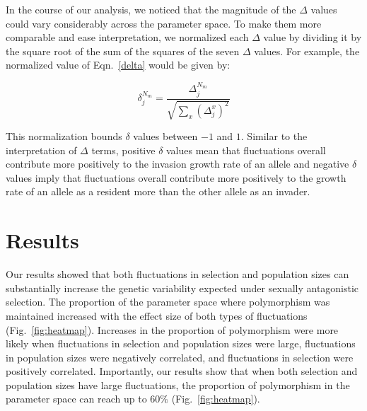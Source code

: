 \begin{refsection}
In the course of our analysis, we noticed that the magnitude of the $\Delta$ values could vary considerably across the parameter space. To make them more comparable and ease interpretation, we normalized each $\Delta$ value by dividing it by the square root of the sum of the squares of the seven $\Delta$ values. For example, the normalized value of Eqn.~\ref{delta} would be given by:



\begin{equation}
  \delta^{N_{m}}_{j}= \frac{\Delta^{N_{m}}_{j}}{\sqrt{
    \sum\limits_{x} (\Delta_{j}^{x})^{2} }}
\end{equation}

This normalization bounds $\delta$ values between $-1$ and $1$. Similar to the interpretation of $\Delta$ terms, positive $\delta$ values mean that fluctuations overall contribute more positively to the invasion growth rate of an allele and negative $\delta$ values imply that fluctuations overall contribute more positively to the growth rate of an allele as a resident more than the other allele as an invader.



\section*{Results}
Our results showed that both fluctuations in selection and population sizes can substantially increase the  genetic variability expected under sexually antagonistic selection. The proportion of the parameter space where polymorphism was maintained increased with the effect size of both types of fluctuations (Fig.~\ref{fig:heatmap}). Increases in the proportion of polymorphism were more likely when fluctuations in selection and population sizes were large, fluctuations in population sizes were negatively correlated, and fluctuations in selection were positively correlated. Importantly, our results show that when both selection and population sizes have large fluctuations, the proportion of polymorphism in the parameter space can reach up to $60\% $ (Fig.~\ref{fig:heatmap}).



\end{refsection}

